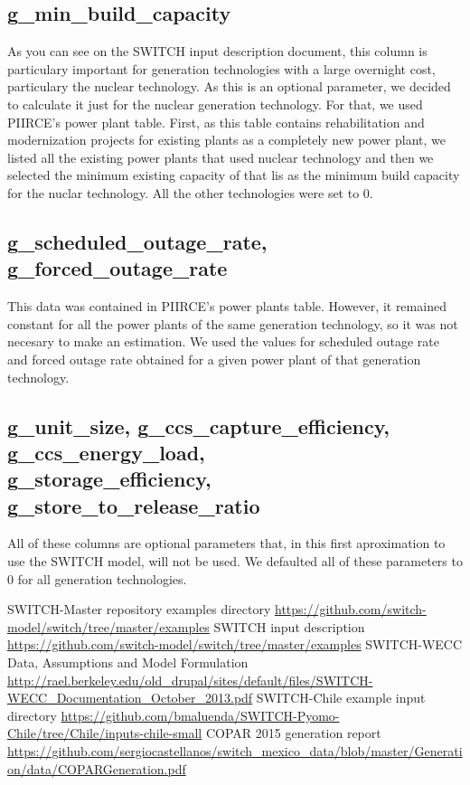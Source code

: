 \documentclass[12pt,letterpaper]{article}
\begin{document}
\subsection{g\_min\_build\_capacity}
As you can see on the SWITCH input description document, this column is particulary important for generation technologies with a large overnight cost, particulary the nuclear technology. As this is an optional parameter, we decided to calculate it just for the nuclear generation technology. For that, we used PIIRCE's power plant table. First, as this table contains rehabilitation and modernization projects for existing plants as a completely new power plant, we listed all the existing power plants that used nuclear technology and then we selected the minimum existing capacity of that lis as the minimum build capacity for the nuclar technology. All the other technologies were set to 0.
\subsection{g\_scheduled\_outage\_rate, g\_forced\_outage\_rate}
This data was contained in PIIRCE's power plants table. However, it remained constant for all the power plants of the same generation technology, so it was not necesary to make an estimation. We used the values for scheduled outage rate and forced outage rate obtained for a given power plant of that generation technology.
\subsection{g\_unit\_size, g\_ccs\_capture\_efficiency, g\_ccs\_energy\_load, \\ g\_storage\_efficiency, g\_store\_to\_release\_ratio}
All of these columns are optional parameters that, in this first aproximation to use the SWITCH model, will not be used. We defaulted all of these parameters to 0 for all generation technologies.
\begin{thebibliography}{9}
 SWITCH-Master repository examples directory \url{https://github.com/switch-model/switch/tree/master/examples}
 SWITCH input description  \url{https://github.com/switch-model/switch/tree/master/examples}
 SWITCH-WECC Data, Assumptions and Model Formulation \url{http://rael.berkeley.edu/old_drupal/sites/default/files/SWITCH-WECC_Documentation_October_2013.pdf}
 SWITCH-Chile example input directory \url{https://github.com/bmaluenda/SWITCH-Pyomo-Chile/tree/Chile/inputs-chile-small}
 COPAR 2015 generation report \url{https://github.com/sergiocastellanos/switch_mexico_data/blob/master/Generation/data/COPARGeneration.pdf}
\end{thebibliography}
\end{document}
